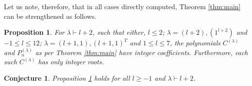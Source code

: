 \documentclass{article}
\newcommand{\ppm}[1]{\textcolor{red}{#1}}
\newtheorem{conjecture}{Conjecture}[theorem]
\newtheorem{proposition}[theorem]{Proposition}
\theoremstyle{definition}
\newcommand{\mdef}{\refstepcounter{theorem}       \medskip \noindent ({\bf \thetheorem}) }
\def\l{\lambda}
\numberwithin{equation}{subsection}
\begin{document}
Let us note, therefore, that in all cases directly computed, Theorem \ref{thm:main} can be strengthened as follows.  %

\begin{proposition}\label{prop:ints} For $\l \vdash l+2$, such that either, $l\leq 2$; $\l=(l+2), (1^{l+2})$ and $-1\leq l\leq 12$; $\l=(l+1,1), (l+1,1)^T$ and $1\leq l \leq 7$, the polynomials $C^{(\l)}$ and $P_n^{(\l)}$ as per Theorem \ref{thm:main} have integer coefficients. Furthermore, each such $C^{(\l)}$ has only integer roots. \end{proposition}



\begin{conjecture} Proposition \ref{prop:ints} holds for all $l\geq -1$ and $\l\vdash l+2$.
\end{conjecture}
\end{document}
